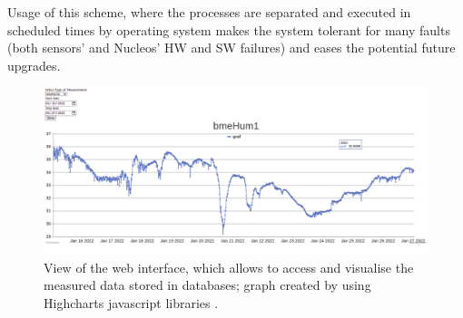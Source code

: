\par

Usage of this scheme, where the processes are separated and executed in scheduled times by operating system makes the system tolerant for many faults (both sensors' and Nucleos' HW and SW failures) and eases the potential future upgrades.



\begin{figure}[H]
 \centering
 \includegraphics[scale=0.25, angle = 0]{./pictures/RemoteWeb.png}
 \caption{View of the web interface, which allows to access and visualise the measured data stored in databases; graph created by using Highcharts javascript libraries \cite{Canvas}.}
 \label{PMT orientation}
 
\end{figure}

